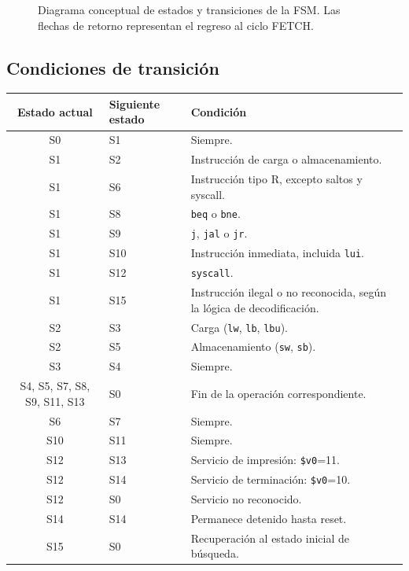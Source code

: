\documentclass[11pt,a4paper]{article}
\begin{document}
\begin{figure}[H]
\caption{Diagrama conceptual de estados y transiciones de la FSM. Las flechas de retorno representan el regreso al ciclo FETCH.}
\end{figure}

\subsection{Condiciones de transición}

\begin{longtable}{@{}clp{8.5cm}@{}}
\toprule
\textbf{Estado actual} & \textbf{Siguiente estado} & \textbf{Condición} \\
\midrule
S0 & S1 & Siempre. \\
S1 & S2 & Instrucción de carga o almacenamiento. \\
S1 & S6 & Instrucción tipo R, excepto saltos y syscall. \\
S1 & S8 & \texttt{beq} o \texttt{bne}. \\
S1 & S9 & \texttt{j}, \texttt{jal} o \texttt{jr}. \\
S1 & S10 & Instrucción inmediata, incluida \texttt{lui}. \\
S1 & S12 & \texttt{syscall}. \\
S1 & S15 & Instrucción ilegal o no reconocida, según la lógica de decodificación. \\
S2 & S3 & Carga (\texttt{lw}, \texttt{lb}, \texttt{lbu}). \\
S2 & S5 & Almacenamiento (\texttt{sw}, \texttt{sb}). \\
S3 & S4 & Siempre. \\
S4, S5, S7, S8, S9, S11, S13 & S0 & Fin de la operación correspondiente. \\
S6 & S7 & Siempre. \\
S10 & S11 & Siempre. \\
S12 & S13 & Servicio de impresión: \texttt{\$v0}=11. \\
S12 & S14 & Servicio de terminación: \texttt{\$v0}=10. \\
S12 & S0 & Servicio no reconocido. \\
S14 & S14 & Permanece detenido hasta reset. \\
S15 & S0 & Recuperación al estado inicial de búsqueda. \\
\bottomrule
\end{longtable}
\end{document}

